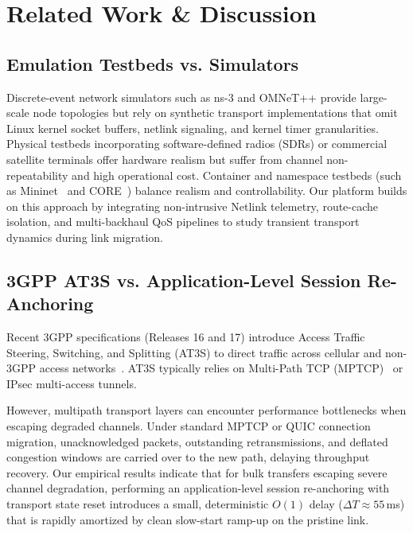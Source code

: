 \documentclass[conference]{IEEEtran}
\begin{document}
\section{Related Work \& Discussion}

\subsection{Emulation Testbeds vs. Simulators}
Discrete-event network simulators such as ns-3 and OMNeT++ provide large-scale node topologies but rely on synthetic transport implementations that omit Linux kernel socket buffers, netlink signaling, and kernel timer granularities. Physical testbeds incorporating software-defined radios (SDRs) or commercial satellite terminals offer hardware realism but suffer from channel non-repeatability and high operational cost. Container and namespace testbeds (such as Mininet~\cite{lantz2010mininet} and CORE~\cite{ahrenholz2010core}) balance realism and controllability. Our platform builds on this approach by integrating non-intrusive Netlink telemetry, route-cache isolation, and multi-backhaul QoS pipelines to study transient transport dynamics during link migration.

\subsection{3GPP AT3S vs. Application-Level Session Re-Anchoring}
Recent 3GPP specifications (Releases 16 and 17) introduce Access Traffic Steering, Switching, and Splitting (AT3S) to direct traffic across cellular and non-3GPP access networks~\cite{3gpp_at3s_rel16}. AT3S typically relies on Multi-Path TCP (MPTCP)~\cite{rfc8684_mptcp} or IPsec multi-access tunnels.

However, multipath transport layers can encounter performance bottlenecks when escaping degraded channels. Under standard MPTCP or QUIC connection migration, unacknowledged packets, outstanding retransmissions, and deflated congestion windows are carried over to the new path, delaying throughput recovery. Our empirical results indicate that for bulk transfers escaping severe channel degradation, performing an application-level session re-anchoring with transport state reset introduces a small, deterministic $O(1)$ delay ($\Delta T \approx 55$\,ms) that is rapidly amortized by clean slow-start ramp-up on the pristine link.
\end{document}
